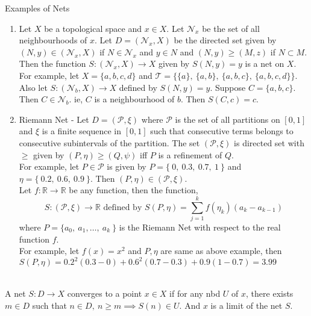 \begin{remark}
\begin{commentary}
Examples of Nets
\begin{enumerate}
	\item Let \( X \) be a topological space and \( x \in X \).
		Let \( \mathcal{N}_x \) be the set of all neighbourhoods of \( x \).
		Let \( D = (\mathcal{N}_x,X) \) be the directed set given by \( (N,y) \in (\mathcal{N}_x,X) \) if \( N \in \mathcal{N}_x \) and \( y \in N \) and \( (N,y) \ge (M,z) \) if \( N \subset M \).
		Then the function \( S : (\mathcal{N}_x,X) \to X \) given by \( S(N,y) = y \) is a net on \( X \).\\

	For example, let $X = \{ a,b,c,d \}$ and $\mathcal{T} = \{ \{a\},\ \{a,b\},\ \{a,b,c\},\ \{a,b,c,d\} \}$.
		Also let $S : (\mathcal{N}_b,X) \to X$ defined by $S(N,y) = y$.
		Suppose $C = \{a,b,c\}$.
		Then $C \in \mathcal{N}_b$.
		ie, $C$ is a neighbourhood of $b$.
		Then $S(C,c) = c$.
	\item Riemann Net - Let $D = (\mathcal{P},\xi)$ where $\mathcal{P}$ is the set of all partitions on $[0,1]$ and $\xi$ is a finite sequence in $[0,1]$ such that consecutive terms belongs to consecutive subintervals of the partition.
		The set $(\mathcal{P},\xi)$ is directed set with $\ge$ given by $(P,\eta) \ge (Q,\psi)$ iff $P$ is a refinement of $Q$.\\
			
	For example, let $P \in \mathcal{P}$ is given by $P = \{\ 0,\ 0.3,\ 0.7,\ 1\ \}$ and $\eta = \{\ 0.2,\ 0.6,\ 0.9\ \}$. Then $(P,\eta) \in (\mathcal{P},\xi)$.\\

	Let $f : \mathbb{R} \to \mathbb{R}$ be any function, then the function,
		\[S : (\mathcal{P},\xi) \to \mathbb{R} \text{ defined by } S(P,\eta) = \sum_{j=1}^k f(\eta_k)(a_k-a_{k-1})\]
	where $P = \{ a_0,\ a_1,\dots,\ a_k \ \}$ is the Riemann Net with respect to the real function $f$.\\

	For example, let $f(x) = x^2$ and $P,\eta$ are same as above example, then $S(P,\eta) = 0.2^2(0.3-0) + 0.6^2(0.7-0.3) + 0.9(1-0.7) = 3.99$
	\end{enumerate}
\end{commentary}
\end{remark}
	
\begin{definition}\cite[10.1.3]{joshi}\\
	A net $S:D \to X$ converges to a point $x \in X$ if for any nbd $U$ of $x$, there exists $m \in D$ such that $n \in D,\ n \ge m \implies S(n) \in U$.
	And $x$ is a limit of the net $S$.
\end{definition}

